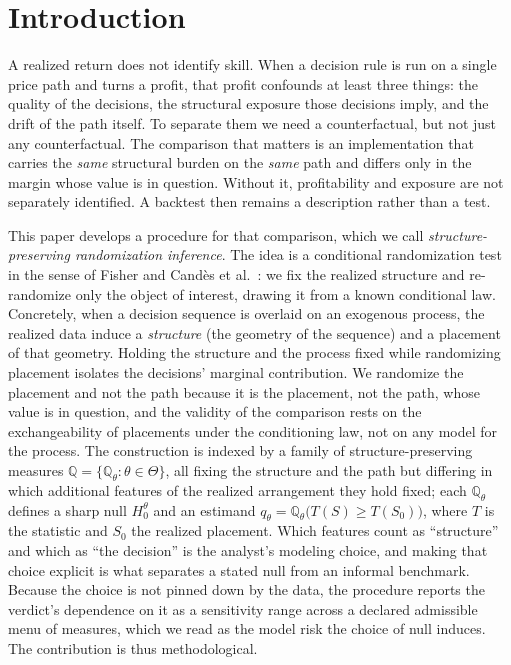 \documentclass[preprint,12pt]{elsarticle}
\theoremstyle{definition}
\begin{document}
\section{Introduction}

A realized return does not identify skill. When a decision rule is run on a single
price path and turns a profit, that profit confounds at least three things: the
quality of the decisions, the structural exposure those decisions imply, and the
drift of the path itself. To separate them we need a counterfactual, but not just any
counterfactual. The comparison that matters is an implementation that carries the
\emph{same} structural burden on the \emph{same} path and differs only in the margin
whose value is in question. Without it, profitability and exposure are not
separately identified. A backtest then remains a description rather than a test.

This paper develops a procedure for that comparison, which we call
\emph{structure-preserving randomization inference}. The idea is a conditional
randomization test in the sense of Fisher \cite{Fisher1935} and Cand\`es et al.\
\cite{Candes2018}: we fix the realized structure and re-randomize only the object of
interest, drawing it from a known conditional law. Concretely, when a decision sequence is overlaid
on an exogenous process, the realized data induce a \emph{structure} (the geometry of
the sequence) and a placement of that geometry. Holding the structure and the process
fixed while randomizing placement isolates the decisions' marginal contribution. We
randomize the placement and not the path because it is the placement, not the path,
whose value is in question, and the validity of the comparison rests on the
exchangeability of placements under the conditioning law, not on any model for the
process. The construction is indexed by a family of
structure-preserving measures $\mathbb{Q}=\{\mathbb{Q}_\theta:\theta\in\Theta\}$, all
fixing the structure and the path but differing in which additional features of the
realized arrangement they hold fixed; each $\mathbb{Q}_\theta$ defines a sharp null
$H_0^\theta$ and an estimand $q_\theta=\mathbb{Q}_\theta\big(T(S)\ge T(S_0)\big)$, where
$T$ is the statistic and $S_0$ the realized placement. Which features count as
``structure'' and which as ``the decision'' is the analyst's modeling choice,
and making that choice explicit is what separates a stated null from an informal
benchmark. Because the choice is not pinned down by the data, the procedure reports
the verdict's dependence on it as a sensitivity range across a declared admissible
menu of measures, which we read as the model risk the choice of null induces. The
contribution is thus methodological.
\end{document}
